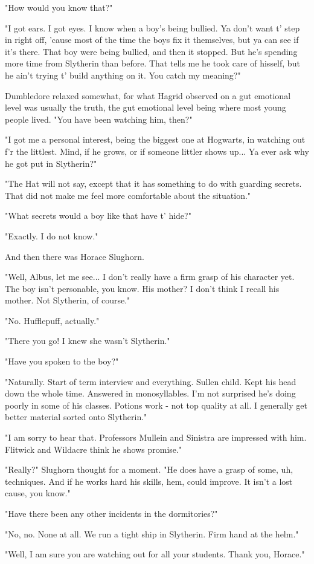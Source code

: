 \documentclass[a4paper,11pt]{article}
\begin{document}
"How would you know that?"

"I got ears. I got eyes. I know when a boy's being bullied. Ya don't want t' step in right off, 'cause most of the time the boys fix it themselves, but ya can see if it's there. That boy were being bullied, and then it stopped. But he's spending more time from Slytherin than before. That tells me he took care of hisself, but he ain't trying t' build anything on it. You catch my meaning?"

Dumbledore relaxed somewhat, for what Hagrid observed on a gut emotional level was usually the truth, the gut emotional level being where most young people lived. "You have been watching him, then?"

"I got me a personal interest, being the biggest one at Hogwarts, in watching out f'r the littlest. Mind, if he grows, or if someone littler shows up... Ya ever ask why he got put in Slytherin?"

"The Hat will not say, except that it has something to do with guarding secrets. That did not make me feel more comfortable about the situation."

"What secrets would a boy like that have t' hide?"

"Exactly. I do not know."

And then there was Horace Slughorn.

"Well, Albus, let me see... I don't really have a firm grasp of his character yet. The boy isn't personable, you know. His mother? I don't think I recall his mother. Not Slytherin, of course."

"No. Hufflepuff, actually."

"There you go! I knew she wasn't Slytherin."

"Have you spoken to the boy?"

"Naturally. Start of term interview and everything. Sullen child. Kept his head down the whole time. Answered in monosyllables. I'm not surprised he's doing poorly in some of his classes. Potions work - not top quality at all. I generally get better material sorted onto Slytherin."

"I am sorry to hear that. Professors Mullein and Sinistra are impressed with him. Flitwick and Wildacre think he shows promise."

"Really?" Slughorn thought for a moment. "He does have a grasp of some, uh, techniques. And if he works hard his skills, hem, could improve. It isn't a lost cause, you know."

"Have there been any other incidents in the dormitories?"

"No, no. None at all. We run a tight ship in Slytherin. Firm hand at the helm."

"Well, I am sure you are watching out for all your students. Thank you, Horace."
\end{document}
